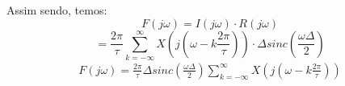 Assim sendo, temos:
\begin{equation}
 F(j\omega) = I(j\omega) \cdot R(j\omega)
\end{equation}
\begin{equation}
 = \frac{2\pi}{\tau}\sum_{k=-\infty}^{\infty}X(j(\omega-k\frac{2\pi}{\tau})) \cdot \Delta sinc\left(\frac{\omega\Delta}{2}\right)
\end{equation}
\begin{align}
F(j\omega) = \frac{2\pi}{\tau} \Delta sinc\left(\frac{\omega\Delta}{2}\right) \sum_{k=-\infty}^{\infty}X\left(j\left(\omega-k\frac{2\pi}{\tau}\right)\right)
\label{eq:flattop}
\end{align}
